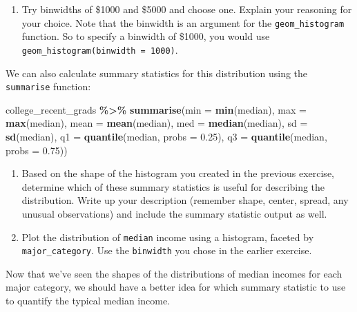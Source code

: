 \documentclass[
]{article}
\newenvironment{Shaded}{\begin{snugshade}}{\end{snugshade}}
\newcommand{\AttributeTok}[1]{\textcolor[rgb]{0.13,0.29,0.53}{#1}}
\newcommand{\FloatTok}[1]{\textcolor[rgb]{0.00,0.00,0.81}{#1}}
\newcommand{\FunctionTok}[1]{\textcolor[rgb]{0.13,0.29,0.53}{\textbf{#1}}}
\newcommand{\NormalTok}[1]{#1}
\newcommand{\SpecialCharTok}[1]{\textcolor[rgb]{0.81,0.36,0.00}{\textbf{#1}}}
\providecommand{\tightlist}{%
  \setlength{\itemsep}{0pt}\setlength{\parskip}{0pt}}
\begin{document}
\begin{enumerate}
\def\labelenumi{\arabic{enumi}.}
\setcounter{enumi}{2}
\tightlist
\item
  Try binwidths of \$1000 and \$5000 and choose one. Explain your
  reasoning for your choice. Note that the binwidth is an argument for
  the \texttt{geom\_histogram} function. So to specify a binwidth of
  \$1000, you would use \texttt{geom\_histogram(binwidth\ =\ 1000)}.
\end{enumerate}

We can also calculate summary statistics for this distribution using the
\texttt{summarise} function:

\begin{Shaded}
\begin{Highlighting}[]
\NormalTok{college\_recent\_grads }\SpecialCharTok{\%\textgreater{}\%}
  \FunctionTok{summarise}\NormalTok{(}\AttributeTok{min =} \FunctionTok{min}\NormalTok{(median), }\AttributeTok{max =} \FunctionTok{max}\NormalTok{(median),}
            \AttributeTok{mean =} \FunctionTok{mean}\NormalTok{(median), }\AttributeTok{med =} \FunctionTok{median}\NormalTok{(median),}
            \AttributeTok{sd =} \FunctionTok{sd}\NormalTok{(median), }
            \AttributeTok{q1 =} \FunctionTok{quantile}\NormalTok{(median, }\AttributeTok{probs =} \FloatTok{0.25}\NormalTok{),}
            \AttributeTok{q3 =} \FunctionTok{quantile}\NormalTok{(median, }\AttributeTok{probs =} \FloatTok{0.75}\NormalTok{))}
\end{Highlighting}
\end{Shaded}

\begin{enumerate}
\def\labelenumi{\arabic{enumi}.}
\setcounter{enumi}{3}
\item
  Based on the shape of the histogram you created in the previous
  exercise, determine which of these summary statistics is useful for
  describing the distribution. Write up your description (remember
  shape, center, spread, any unusual observations) and include the
  summary statistic output as well.
\item
  Plot the distribution of \texttt{median} income using a histogram,
  faceted by \texttt{major\_category}. Use the \texttt{binwidth} you
  chose in the earlier exercise.
\end{enumerate}

Now that we've seen the shapes of the distributions of median incomes
for each major category, we should have a better idea for which summary
statistic to use to quantify the typical median income.
\end{document}

